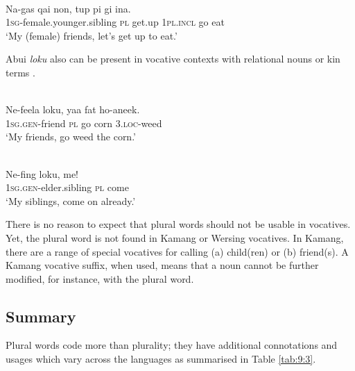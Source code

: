 \ea%
\label{ex:9:90}
 \\
\gll  Na-{gas qai} non, tup pi gi ina. \\
   \textsc{1sg-}female.younger.sibling \textsc{pl} get.up \textsc{1pl.incl} go eat  \\
\glt `My (female) friends, let's get up to eat.'
\z






Abui \textit{loku} also can be present in vocative contexts with relational nouns  or kin terms .


\ea%
\label{ex:9:91}
 \\
\gll  Ne-feela loku, yaa fat ho-aneek.\\
   \textsc{1sg.gen-}friend \textsc{pl} go corn \textsc{3.loc}-weed \\
\glt `My friends, go weed the corn.'
\z







\ea%
\label{ex:9:92}
 \\
\gll  Ne-fing loku, me! \\
    \textsc{1sg.gen-}elder.sibling \textsc{pl} come \\
\glt `My siblings, come on already.'
\z






There is no reason to expect that plural words should not be usable in vocatives. Yet, the plural word is not found in Kamang or Wersing vocatives. In Kamang, there are a range of special vocatives for calling (a) child(ren) or (b) friend(s). A Kamang vocative suffix, when used, means that a noun cannot be further modified, for instance, with the plural word.

\subsection{Summary}  %
\label{sec:9:4.6}
Plural words code more than plurality; they have additional connotations and usages which vary across the languages as summarised in Table \ref{tab:9:3}.

